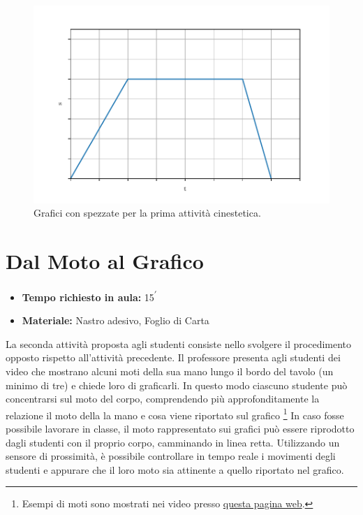 \documentclass{report} \usepackage[T1]{fontenc} \usepackage[italian]{babel}
\begin{document}
\begin{figure}[H]
\centering
  \includegraphics[width=\textwidth]{kine_plot3}
  \caption{Grafici con spezzate per la prima attività
           cinestetica.}
  \label{fig:kine_plot3}
\end{figure}


\section{Dal Moto al Grafico}

\begin{itemize}
\item \textbf{Tempo richiesto in aula:} 15\textsuperscript{$\prime$}
\item \textbf{Materiale:} Nastro adesivo, Foglio di Carta
\end{itemize}

La seconda attività proposta agli studenti consiste nello svolgere il
procedimento opposto rispetto all’attività precedente. Il professore presenta
agli studenti dei video che mostrano  alcuni moti della sua mano lungo il bordo
del tavolo (un minimo di tre) e chiede loro di graficarli. In questo modo
ciascuno studente può concentrarsi sul moto del corpo, comprendendo più
approfonditamente la relazione il moto della la mano e cosa viene riportato
sul grafico
\footnote{
          Esempi di moti sono mostrati nei video presso
          \href{https://github.com/savaroskij/PED1/tree/master/progetto_finale/media/video/kine_videos_2}{questa pagina web}.
}
In caso fosse possibile lavorare in classe, il moto rappresentato sui grafici
può essere riprodotto dagli studenti con il proprio corpo, camminando in linea
retta. Utilizzando un sensore di prossimità, è possibile controllare in
tempo reale i movimenti degli studenti e appurare che il loro moto sia
attinente a quello riportato nel grafico.
\end{document}
